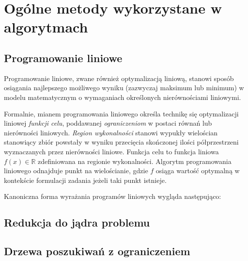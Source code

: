 \section{Ogólne metody wykorzystane w algorytmach}\label{section_methods}

\subsection{Programowanie liniowe}\label{subsection_lp}

Programowanie liniowe, zwane również optymalizacją liniową, stanowi sposób
osiągania najlepszego możliwego wyniku (zazwyczaj maksimum lub minimum) w modelu 
matematycznym o wymaganiach określonych nierównościami liniowymi.

Formalnie, mianem programowania liniowego określa technikę się optymalizacji 
liniowej \emph{funkcji celu}, poddawanej \emph{ograniczeniom} w postaci równań 
lub nierówności liniowych.
\emph{Region wykonalności} stanowi wypukły wielościan stanowiący zbiór powstały
w wyniku przecięcia skończonej ilości półprzestrzeni wyznaczanych przez
nierówności liniowe.
Funkcja celu to funkcja liniowa $f(x) \in \mathbb{R}$ zdefiniowana na regionie
wykonalności. Algorytm programowania liniowego odnajduje punkt na wielościanie,
gdzie $f$ osiąga wartość optymalną w kontekście formulacji zadania jeżeli taki
punkt istnieje.

Kanoniczna forma wyrażania programów liniowych wygląda następująco:

\subsection{Redukcja do jądra problemu}\label{subsection_kernelization}
\subsection{Drzewa poszukiwań z ograniczeniem}\label{subsection_bound_search_trees}

